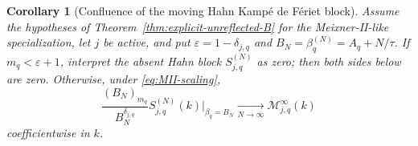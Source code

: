 \documentclass[10pt]{amsart}
\theoremstyle{plain}
\newtheorem{corollary}[theorem]{Corollary}
\theoremstyle{definition}
\theoremstyle{remark}
\begin{document}
\begin{corollary}[Confluence of the moving Hahn Kamp\'e de F\'eriet block]
\label{cor:MII-moving-KdF-block}
Assume the hypotheses of
Theorem~\ref{thm:explicit-unreflected-B} for the Meixner-II-like
specialization, let \(j\) be active, and put
\(\varepsilon=1-\delta_{j,q}\) and
\(B_N=\beta_q^{(N)}=A_q+N/\tau\).  If
\(m_q<\varepsilon+1\), interpret the absent Hahn block
\(S_{j,q}^{(N)}\) as zero; then both sides below are zero.  Otherwise,
under \eqref{eq:MII-scaling},
\begin{equation}
 \frac{(B_N)_{m_q}}{B_N^{\delta_{j,q}}}
 S_{j,q}^{(N)}(k)\big|_{\beta_q=B_N}
 \xrightarrow[N\to\infty]{}
 \mathscr M_{j,q}^{\infty}(k)
 \label{eq:Hahn-MII-moving-block-limit}
\end{equation}
coefficientwise in \(k\).


\end{corollary}
\end{document}

